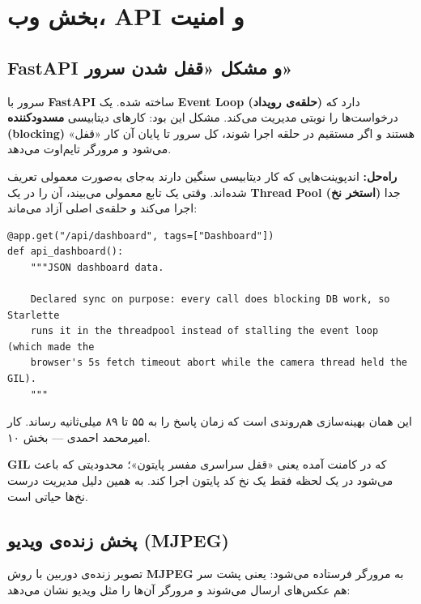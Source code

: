\documentclass[12pt,a4paper]{article}
\begin{document}
\section{بخش وب، API و امنیت}

\subsection{FastAPI و مشکل «قفل شدن سرور»}
سرور با \textbf{FastAPI} ساخته شده.  یک \textbf{Event Loop (حلقه‌ی رویداد)} دارد که درخواست‌ها را نوبتی مدیریت می‌کند. مشکل این بود: کارهای دیتابیسی \textbf{مسدودکننده (blocking)} هستند و اگر مستقیم در حلقه اجرا شوند، کل سرور تا پایان آن کار «قفل» می‌شود و مرورگر تایم‌اوت می‌دهد.

\textbf{راه‌حل:} اندپوینت‌هایی که کار دیتابیسی سنگین دارند به‌جای  به‌صورت  معمولی تعریف شده‌اند. وقتی  یک تابع معمولی می‌بیند، آن را در یک \textbf{Thread Pool (استخر نخ)} جدا اجرا می‌کند و حلقه‌ی اصلی آزاد می‌ماند:

\begin{latin}
\begin{lstlisting}
@app.get("/api/dashboard", tags=["Dashboard"])
def api_dashboard():
    """JSON dashboard data.

    Declared sync on purpose: every call does blocking DB work, so Starlette
    runs it in the threadpool instead of stalling the event loop (which made the
    browser's 5s fetch timeout abort while the camera thread held the GIL).
    """
\end{lstlisting}
\end{latin}

\begin{note}
این همان بهینه‌سازی هم‌روندی است که زمان پاسخ  را به ۵۵ تا ۸۹ میلی‌ثانیه رساند. کار امیرمحمد احمدی — بخش ۱۰.

\textbf{GIL} که در کامنت آمده یعنی «قفل سراسری مفسر پایتون»؛ محدودیتی که باعث می‌شود در یک لحظه فقط یک نخ کد پایتون اجرا کند. به همین دلیل مدیریت درست نخ‌ها حیاتی است.
\end{note}

\subsection{پخش زنده‌ی ویدیو (MJPEG)}
تصویر زنده‌ی دوربین با روش \textbf{MJPEG} به مرورگر فرستاده می‌شود: یعنی پشت سر هم عکس‌های  ارسال می‌شوند و مرورگر آن‌ها را مثل ویدیو نشان می‌دهد:
\end{document}
